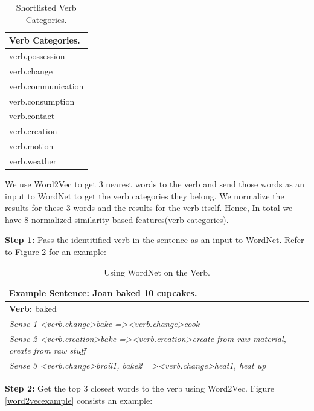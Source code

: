 \documentclass[11pt]{article}
\begin{document}
\newpage
\begin{table}[h!]
\centering
\begin{tabular}{ | m{15em} | }
\hline
 \textbf{Verb Categories.}\\
\hline
verb.possession\\
\hline
verb.change\\
\hline
verb.communication\\
\hline
verb.consumption\\
\hline
verb.contact\\
\hline
verb.creation\\
\hline
verb.motion\\
\hline
verb.weather\\
\hline
\end{tabular}
\caption{Shortlisted Verb Categories.}
\label{figure:19}
\end{table}

We use Word2Vec to get 3 nearest words to the verb and send those words as an input to WordNet to get the verb categories they belong. We normalize the results for these 3 words and the results for the verb itself. Hence, In total we have 8 normalized similarity based features(verb categories).

\textbf{Step 1:} Pass the identitified verb in the sentence as an input to WordNet. Refer to Figure \ref{wordnetexample} for an example:

\begin{table}[h!]
\centering
\begin{tabular}{ | m{30em} |}
\hline
\textbf{Example Sentence:} Joan baked 10 cupcakes.\\
\hline
 \textbf{Verb:} baked\\
\hline
\textit{Sense 1 \textless verb.change\textgreater bake =\textgreater \textless verb.change\textgreater cook}\\
\hline
\textit{Sense 2 \textless verb.creation\textgreater bake =\textgreater \textless verb.creation\textgreater create from raw material, create from raw stuff}\\
\hline
\textit{Sense 3 \textless verb.change\textgreater broil1, bake2 =\textgreater \textless verb.change\textgreater heat1, heat up}\\
\hline
\end{tabular}
\caption{Using WordNet on the Verb.}
\label{wordnetexample}
\end{table}

\textbf{Step 2:} Get the top 3 closest words to the verb using Word2Vec. Figure \ref{word2vecexample} consists an example:
\end{document}

